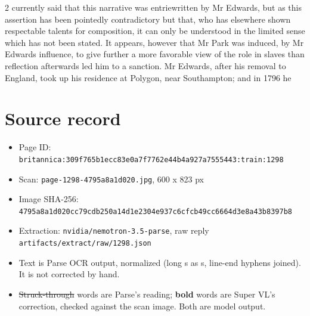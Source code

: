 \documentclass[10pt]{article}
\begin{document}
\begin{multicols}{2}
currently said that this narrative was entriewritten by Mr Edwards, but as this assertion has been pointedly contradictory but that, who has elsewhere shown respectable talents for composition, it can only be understood in the limited sense which has not been stated. It appears, however that Mr Park was induced, by Mr Edwards influence, to give further a more favorable view of the role in slaves than reflection afterwards led him to a sanction. Mr Edwards, after his removal to England, took up his residence at Polygon, near Southampton; and in 1796 he
\end{multicols}
\section*{Source record}
\begin{itemize}
\item Page ID: \texttt{britannica:309f765b1ecc83e0a7f7762e44b4a927a7555443:train:1298}
\item Scan: \texttt{page-1298-4795a8a1d020.jpg}, 600 x 823 px
\item Image SHA-256: \texttt{\small 4795a8a1d020cc79cdb250a14d1e2304e937c6cfcb49cc6664d3e8a43b8397b8}
\item Extraction: \texttt{nvidia/nemotron-3.5-parse}, raw reply \texttt{artifacts/extract/raw/1298.json}
\item Text is Parse OCR output, normalized (long s as s, line-end hyphens joined). It is not corrected by hand.
\item \sout{Struck-through} words are Parse's reading; \textbf{bold} words are Super VL's correction, checked against the scan image. Both are model output.
\end{itemize}
\end{document}

